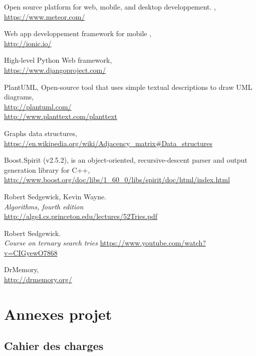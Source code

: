 \documentclass[french]{article}
\begin{document}
	\begin{thebibliography}{9}
		Open source platform for web, mobile, and desktop developpement. ,\\ \url{https://www.meteor.com/}
		
		Web app developpement framework for mobile ,\\ \url{http://ionic.io/}
		
		High-level Python Web framework, \\ \url{https://www.djangoproject.com/}
		
		PlantUML, Open-source tool that uses simple textual descriptions to draw UML diagrams,\\ \url{http://plantuml.com/}\\ \url{http://www.planttext.com/planttext}
		
		Graphs data structures,\\ \url{https://en.wikipedia.org/wiki/Adjacency_matrix#Data_structures}
		
		Boost.Spirit (v2.5.2), is an object-oriented, recursive-descent parser and output generation library for C++,\\ \url{http://www.boost.org/doc/libs/1_60_0/libs/spirit/doc/html/index.html}
		
		Robert Sedgewick, Kevin Wayne.\\
		\emph{Algorithms, fourth edition}\\
		\url{http://algs4.cs.princeton.edu/lectures/52Tries.pdf}
		
		Robert Sedgewick.\\
		\emph{Course on ternary search tries}
		\url{https://www.youtube.com/watch?v=CIGyewO7868}
		
		DrMemory,\\
		\url{http://drmemory.org/}
	\end{thebibliography}
			
	\newpage
		
		
	\section{Annexes projet}
		\subsection{Cahier des charges}
			
\end{document}
